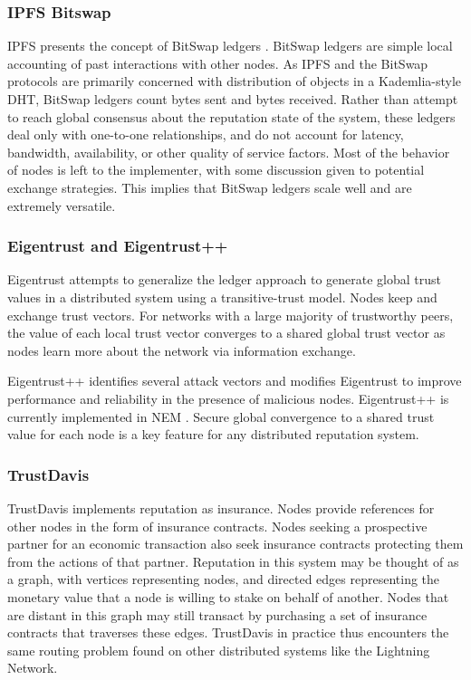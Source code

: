 \documentclass[a4paper,10pt]{article}
\begin{document}
\subsubsection{IPFS Bitswap}
IPFS presents the concept of BitSwap ledgers \cite{18}. BitSwap ledgers are
simple local accounting of past interactions with other nodes. As IPFS and the
BitSwap protocols are primarily concerned with distribution of objects in a
Kademlia-style DHT, BitSwap ledgers count bytes sent and bytes received. Rather
than attempt to reach global consensus about the reputation state of the system,
these ledgers deal only with one-to-one relationships, and do not account for
latency, bandwidth, availability, or other quality of service factors. Most of
the behavior of nodes is left to the implementer, with some discussion given to
potential exchange strategies. This implies that BitSwap ledgers scale well and
are extremely versatile.

\subsubsection{Eigentrust and Eigentrust++}
Eigentrust \cite{19} attempts to generalize the ledger approach to generate
global trust values in a distributed system using a transitive-trust model.
Nodes keep and exchange trust vectors. For networks with a large majority of
trustworthy peers, the value of each local trust vector converges to a shared
global trust vector as nodes learn more about the network via information
exchange.

Eigentrust++ \cite{20} identifies several attack vectors and modifies Eigentrust
to improve performance and reliability in the presence of malicious nodes.
Eigentrust++ is currently implemented in NEM \cite{21}. Secure global
convergence to a shared trust value for each node is a key feature for any
distributed reputation system.

\subsubsection{TrustDavis}
TrustDavis \cite{22} implements reputation as insurance. Nodes provide
references for other nodes in the form of insurance contracts. Nodes seeking a
prospective partner for an economic transaction also seek insurance contracts
protecting them from the actions of that partner. Reputation in this system may
be thought of as a graph, with vertices representing nodes, and directed edges
representing the monetary value that a node is willing to stake on behalf of
another. Nodes that are distant in this graph may still transact by purchasing a
set of insurance contracts that traverses these edges. TrustDavis in practice
thus encounters the same routing problem found on other distributed systems like
the Lightning Network.
\end{document}
